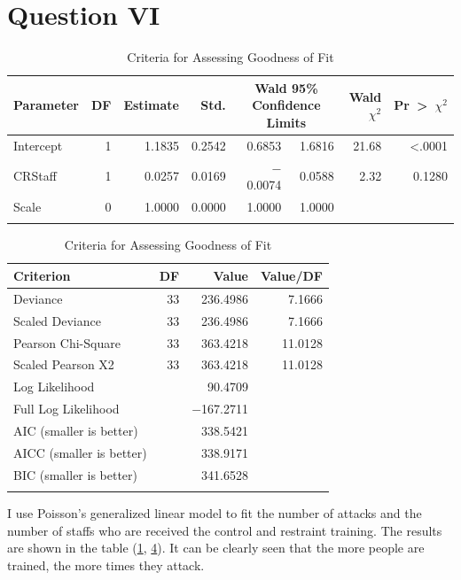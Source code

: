 \section*{Question VI}

\begin{table}[H]
\centering
\begin{longtable}{lrrrrrrr}
\toprule
   Parameter &    DF &    Estimate &    Std. &    \multicolumn{2}{c}{Wald 95\% Confidence Limits} &    Wald $\chi^{2}$ &    Pr~>~$\chi^{2}$\\
\endhead
\midrule
   Intercept &    1 &    1.1835 &    0.2542 &    0.6853 &    1.6816 &    21.68 &    <.0001\\
   CRStaff &    1 &    0.0257 &    0.0169 &    $-$0.0074 &    0.0588 &    2.32 &    0.1280\\
   Scale &    0 &    1.0000 &    0.0000 &    1.0000 &    1.0000 &      &     \\
\bottomrule
\caption{Analysis of Maximum Likelihood Parameter Estimates}
\label{t8}
\end{longtable}

\begin{longtable}{lrrr}
\toprule
   Criterion &    DF &    Value &    Value/DF\\
\endhead
\midrule
   Deviance &    33 &    236.4986 &    7.1666\\
   Scaled Deviance &    33 &    236.4986 &    7.1666\\
   Pearson Chi-Square &    33 &    363.4218 &    11.0128\\
   Scaled Pearson X2 &    33 &    363.4218 &    11.0128\\
   Log Likelihood &      &    90.4709 &     \\
   Full Log Likelihood &      &    $-$167.2711 &     \\
   AIC (smaller is better) &      &    338.5421 &     \\
   AICC (smaller is better) &      &    338.9171 &     \\
   BIC (smaller is better) &      &    341.6528 &     \\
\bottomrule
\caption{Criteria for Assessing Goodness of Fit}
\label{t9}
\end{longtable}
\end{table}

I use Poisson's generalized linear model to fit the number of attacks and the number of staffs who are received the control and restraint training. The results are shown in the table (\ref{t8}, \ref{t9}). It can be clearly seen that the more people are trained, the more times they attack.


